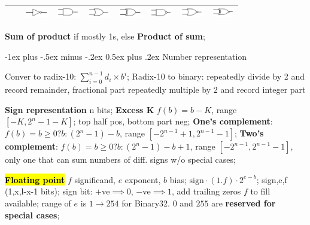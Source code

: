 \documentclass[a4paper]{article}
\makeatletter
\renewcommand{\section}{\@startsection{section}{1}{0mm}%
                                {-1ex plus -.5ex minus -.2ex}%
                                {0.5ex plus .2ex}%
                                {\normalfont\normalsize\bfseries}}
\makeatother
\begin{document}
\begin{multicols*}{2}
\begin{tabular}{|c|c|c|c|c|c|c|c|c|}
      &   & \includegraphics[width=1cm]{./gate-not.png} & \includegraphics[width=1cm]{./gate-and.png} & \includegraphics[width=1cm]{./gate-or.png} & \includegraphics[width=1cm]{./gate-xor.png} & \includegraphics[width=1cm]{./gate-nand.png} & \includegraphics[width=1cm]{./gate-nor.png} & \includegraphics[width=1cm]{./gate-xnor.png} \\ \hline
  \end{tabular}

  \textbf{Sum of product} if mostly 1s, else \textbf{Product of sum};

  \section{Number representation}

  Conver to radix-10: $\sum^{n-1}_{i=0} d_i \times b^i$; Radix-10 to binary: repeatedly divide by 2 and record remainder, fractional part repeatedly multiple by 2 and record integer part

  \textbf{Sign representation} n bits; \textbf{Excess K} $f(b) = b - K$, range $[-K, 2^n - 1 -K]$; top half pos, bottom part neg; \textbf{One's complement}: $f(b) = b \geq 0 ? b : (2^n-1)-b$, range $[-2^{n-1}+1, 2^{n-1}-1]$; \textbf{Two's complement}: $f(b) = b \geq 0 ? b : (2^n-1)-b+1$, range $[-2^{n-1}, 2^{n-1}-1]$, only one that can sum numbers of diff. signs w/o special cases;

  \hl{\textbf{Floating point}} $f$ significand, $e$ exponent, $b$ bias; $\mathrm{sign}\cdot(1.f)\cdot2^{e-b}$; sign,e,f (1,x,l-x-1 bits); sign bit: $+\text{ve} \implies 0$, $-\text{ve} \implies 1$, add trailing zeros $f$ to fill available; range of $e$ is $1\rightarrow254$ for Binary32. $0$ and $255$ are \textbf{reserved for special cases};


\end{multicols*}
\end{document}
